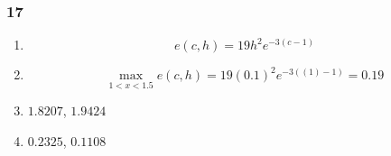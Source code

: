 \documentclass{article}
\begin{document}
\subsubsection{17}

\begin{enumerate}
  \item \[e(c, h) = 19 h^2 e^{-3 (c - 1)}\]

  \item \[\max_{1 < x < 1.5} e(c, h) = 19 (0.1)^2 e^{-3 ((1) - 1)} = 0.19\]

  \item $1.8207$, $1.9424$

  \item $0.2325$, $0.1108$
\end{enumerate}
\end{document}
